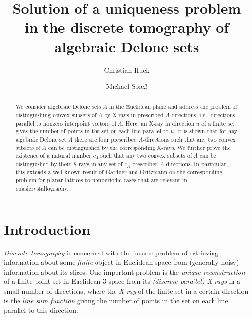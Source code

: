 \documentclass[a4paper]{amsart}
\theoremstyle{definition}
\numberwithin{equation}{section}
\numberwithin{theorem}{section}
\begin{document}
\title[Uniqueness in discrete tomography of algebraic Delone sets]{Solution of a uniqueness
  problem in the discrete tomography of algebraic Delone sets}
\author{Christian Huck}
\author{Michael Spie\ss}
\address{Fakult\"{a}t f\"{u}r Mathematik,
  Universit\"{a}t Bielefeld, Postfach 100131, 33501 Bielefeld, Germany}


\begin{abstract}
We consider algebraic Delone sets $\varLambda$ in the
Euclidean plane and address the problem of
distinguishing convex subsets of $\varLambda$ by X-rays in prescribed $\varLambda$-directions, i.e., directions parallel to nonzero
interpoint vectors of $\varLambda$.  Here, an X-ray in direction
$u$ of a finite
 set gives the number of points in the set on each line
parallel to $u$. It is shown
that for any algebraic Delone set $\varLambda$ there are four
prescribed $\varLambda$-directions such that any two convex subsets of
$\varLambda$ can be distinguished by the corresponding X-rays. We
further prove the existence of a natural number
$c_{\varLambda}$ such that any two convex subsets of $\varLambda$ can be distinguished by their X-rays in any set of
$c_{\varLambda}$ prescribed
$\varLambda$-directions. In particular, this extends a well-known result of Gardner
and Gritzmann on the corresponding problem for planar lattices to
nonperiodic cases that are relevant in quasicrystallography.
\end{abstract}

\maketitle

\section{Introduction}\label{intro}
{\em Discrete tomography} is concerned with the 
inverse problem of retrieving information about some {\em finite}
object in Euclidean space from 
(generally noisy) information about its slices. One important problem
is the {\em unique reconstruction} of a finite point set in Euclidean $3$-space 
from its {\em (discrete parallel) X-rays} in a small number of directions, where the
  {\em X-ray} of the finite set in a certain direction is the {\em line sum
  function} giving the
number of points in the set on each line parallel to this direction. 
\end{document}
